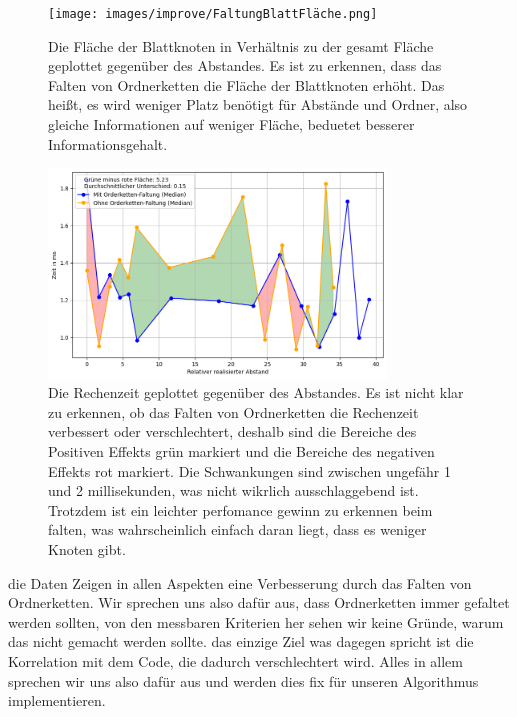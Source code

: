 \begin{figure}
    \centering
    \texttt{[image: images/improve/FaltungBlattFläche.png]}
    \caption{Die Fläche der Blattknoten in Verhältnis zu der gesamt Fläche geplottet gegenüber des Abstandes. Es ist zu erkennen, dass das Falten von Ordnerketten die Fläche der Blattknoten erhöht. Das heißt, es wird weniger Platz benötigt für Abstände und Ordner, also gleiche Informationen auf weniger Fläche, beduetet besserer Informationsgehalt.}
    \label{fig:FaltungBlattFläche}
\end{figure}

\begin{figure}
    \centering
    \includegraphics[width=0.8\textwidth]{images/improve/FaltungZeit.png}
    \caption{Die Rechenzeit geplottet gegenüber des Abstandes. Es ist nicht klar zu erkennen, ob das Falten von Ordnerketten die Rechenzeit verbessert oder verschlechtert, deshalb sind die Bereiche des Positiven Effekts grün markiert und die Bereiche des negativen Effekts rot markiert. Die Schwankungen sind zwischen ungefähr 1 und 2 millisekunden, was nicht wikrlich ausschlaggebend ist. Trotzdem ist ein leichter perfomance gewinn zu erkennen beim falten, was wahrscheinlich einfach daran liegt, dass es weniger Knoten gibt.}
    \label{fig:FaltungZeit}
\end{figure}

die Daten Zeigen in allen Aspekten eine Verbesserung durch das Falten von Ordnerketten. Wir sprechen uns also dafür aus, dass Ordnerketten immer gefaltet werden sollten, von den messbaren Kriterien her sehen wir keine Gründe, warum das nicht gemacht werden sollte. das einzige Ziel was dagegen spricht ist die Korrelation mit dem Code, die dadurch verschlechtert wird. Alles in allem sprechen wir uns also dafür aus und werden dies fix für unseren Algorithmus implementieren.



